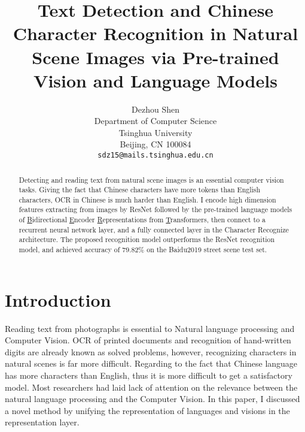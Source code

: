 \documentclass[review]{cvpr}
\begin{document}
\title{Text Detection and Chinese Character Recognition in Natural Scene Images via Pre-trained Vision and Language Models}

\author{Dezhou Shen\\
Department of Computer Science\\
Tsinghua University\\
Beijing, CN 100084\\
{\tt\small sdz15@mails.tsinghua.edu.cn}
}

\maketitle


\begin{abstract}

  Detecting and reading text from natural scene images is an essential computer vision tasks.
  Giving the fact that Chinese characters have more tokens than English characters, OCR in Chinese is much harder than English.
  I encode high dimension features extracting from images by ResNet followed by the pre-trained language models of
  \underline{B}idirectional \underline{E}ncoder \underline{R}epresentations from \underline{T}ransformers,
  then connect to a recurrent neural network layer, and a fully connected layer in the Character Recognize architecture.
  The proposed recognition model outperforms the ResNet recognition model, and achieved accuracy of $79.82\%$ on the Baidu2019 street scene test set.

\end{abstract}

\section{Introduction}

  Reading text from photographs is essential to Natural language processing and Computer Vision.
  OCR of printed documents and recognition of hand-written digits are already known as solved problems,
  however, recognizing characters in natural scenes is far more difficult.
  Regarding to the fact that Chinese language has more characters than English, thus it is more difficult to get a satisfactory model.
  Most researchers had laid lack of attention on the relevance between the natural language processing and the Computer Vision.
  In this paper, I discussed a novel method by unifying the representation of languages and visions in the representation layer.
\end{document}
